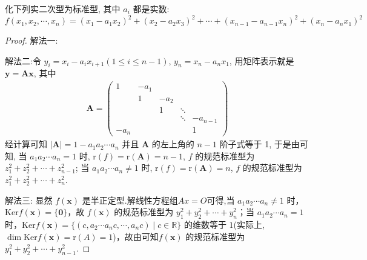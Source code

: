 \documentclass[../../main.tex]{subfiles}
\begin{document}
\begin{example}\label{example:例8.35}
化下列实二次型为标准型, 其中 \(a_i\) 都是实数:
\[f(x_1,x_2,\cdots,x_n)=(x_1 - a_1x_2)^2+(x_2 - a_2x_3)^2+\cdots+(x_{n - 1} - a_{n - 1}x_n)^2+(x_n - a_nx_1)^2\]
\end{example}
\begin{proof}
{\color{blue}解法一:}

{\color{blue}解法二:}令 \(y_i = x_i - a_ix_{i + 1}(1\leqslant  i\leqslant  n - 1)\), \(y_n = x_n - a_nx_1\), 用矩阵表示就是 \(\boldsymbol{y} = \boldsymbol{A}\boldsymbol{x}\), 其中
\begin{align*}
\boldsymbol{A} = \begin{pmatrix}
1 & -a_1 & & & \\
& 1 & -a_2 & & \\
& & 1 & \ddots & \\
& & & \ddots & -a_{n - 1} \\
-a_n & & & & 1
\end{pmatrix}
\end{align*}
经计算可知 \(|\boldsymbol{A}| = 1 - a_1a_2\cdots a_n\) 并且 \(\boldsymbol{A}\) 的左上角的 \(n - 1\) 阶子式等于 1, 于是由可知, 当 \(a_1a_2\cdots a_n = 1\) 时, \(\mathrm{r}(f)=\mathrm{r}(\boldsymbol{A}) = n - 1\), \(f\) 的规范标准型为 \(z_1^2 + z_2^2 + \cdots + z_{n - 1}^2\); 当 \(a_1a_2\cdots a_n\neq1\) 时, \(\mathrm{r}(f)=\mathrm{r}(\boldsymbol{A}) = n\), \(f\) 的规范标准型为 \(z_1^2 + z_2^2 + \cdots + z_n^2\).

{\color{blue}解法三:}
显然 $f(\boldsymbol{x})$ 是半正定型.解线性方程组$Ax=O$可得,当 $a_1a_2\cdots a_n\neq1$ 时，$\mathrm{Ker} f(\boldsymbol{x}) = \{\boldsymbol{0}\}$，故 $f(\boldsymbol{x})$ 的规范标准型为 $y_1^2 + y_2^2+\cdots + y_n^2$；当 $a_1a_2\cdots a_n = 1$ 时，$\mathrm{Ker} f(\boldsymbol{x})=\{(c,a_2\cdots a_n c,\cdots,a_n c)\mid c\in\mathbb{R}\}$ 的维数等于 $1$(实际上,$\dim \mathrm{Ker} f(\boldsymbol{x})=\mathrm{r}(A)=1$)，故由可知$f(\boldsymbol{x})$ 的规范标准型为 $y_1^2 + y_2^2+\cdots + y_{n - 1}^2$.

\end{proof}
\end{document}
